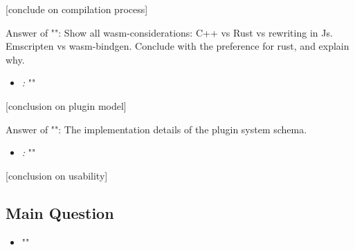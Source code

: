 [conclude on compilation process]

Answer of "\mySubRQTwoTitle": Show all wasm-considerations: C++ vs Rust vs rewriting in Js. Emscripten vs wasm-bindgen. Conclude with the preference for rust, and explain why.

\begin{itemize}[ ]
  \item \emph{\mySubRQThreeTitle:}  "\mySubRQThree"
\end{itemize}

[conclusion on plugin model]

Answer of "\mySubRQThreeTitle": The implementation details of the plugin system schema. 

\begin{itemize}[ ]
  \item \emph{\mySubRQFourTitle:} "\mySubRQFour"
\end{itemize}

[conclusion on usability]


\subsection*{Main Question}

\begin{itemize}[ ]
    \item "\myMainRQ"
\end{itemize}


